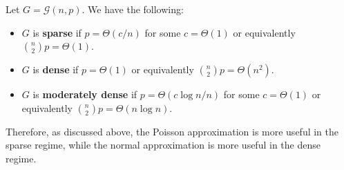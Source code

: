 \documentclass{article}
\begin{document}
\begin{definition}
    Let $G=\mathcal{G}(n,p)$. We have the following:
    \begin{itemize}
        \item $G$ is \textbf{sparse} if $p=\Theta(c/n)$ for some $c=\Theta(1)$ or equivalently $\binom{n}{2}p=\Theta(1)$.
        \item $G$ is \textbf{dense} if $p=\Theta(1)$ or equivalently $\binom{n}{2}p=\Theta(n^2)$.
        \item $G$ is \textbf{moderately dense} if $p=\Theta(c\log n/n)$ for some $c=\Theta(1)$ or equivalently $\binom{n}{2}p=\Theta(n\log n)$.
    \end{itemize}
\end{definition}

Therefore, as discussed above, the Poisson approximation is more useful in the sparse regime, while the normal approximation is more useful in the dense regime.  


\newpage


\end{document}
